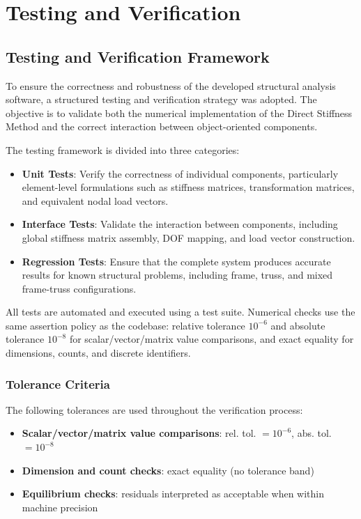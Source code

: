 \chapter{Testing and Verification}

\section{Testing and Verification Framework}

To ensure the correctness and robustness of the developed structural analysis software, a structured testing and verification strategy was adopted. The objective is to validate both the numerical implementation of the Direct Stiffness Method and the correct interaction between object-oriented components.

The testing framework is divided into three categories:

\begin{itemize}
    \item \textbf{Unit Tests}: Verify the correctness of individual components, particularly element-level formulations such as stiffness matrices, transformation matrices, and equivalent nodal load vectors.

    \item \textbf{Interface Tests}: Validate the interaction between components, including global stiffness matrix assembly, DOF mapping, and load vector construction.

    \item \textbf{Regression Tests}: Ensure that the complete system produces accurate results for known structural problems, including frame, truss, and mixed frame-truss configurations.
\end{itemize}

All tests are automated and executed using a test suite. Numerical checks use the same assertion policy as the codebase: relative tolerance $10^{-6}$ and absolute tolerance $10^{-8}$ for scalar/vector/matrix value comparisons, and exact equality for dimensions, counts, and discrete identifiers.

\subsection*{Tolerance Criteria}

The following tolerances are used throughout the verification process:

\begin{itemize}
    \item \textbf{Scalar/vector/matrix value comparisons}: rel. tol. $=10^{-6}$, abs. tol. $=10^{-8}$
    \item \textbf{Dimension and count checks}: exact equality (no tolerance band)
    \item \textbf{Equilibrium checks}: residuals interpreted as acceptable when within machine precision
\end{itemize}

